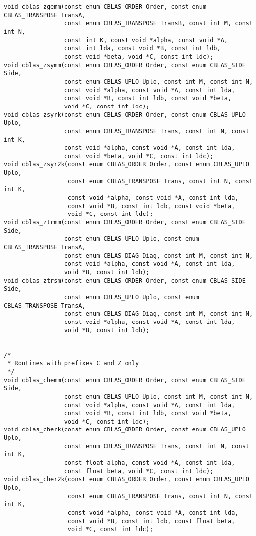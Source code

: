 \documentclass{article}
\begin{document}
\begin{Verbatim}[fontsize=\small,fontfamily=tt,fontshape=rm]
void cblas_zgemm(const enum CBLAS_ORDER Order, const enum CBLAS_TRANSPOSE TransA,
                 const enum CBLAS_TRANSPOSE TransB, const int M, const int N,
                 const int K, const void *alpha, const void *A,
                 const int lda, const void *B, const int ldb,
                 const void *beta, void *C, const int ldc);
void cblas_zsymm(const enum CBLAS_ORDER Order, const enum CBLAS_SIDE Side,
                 const enum CBLAS_UPLO Uplo, const int M, const int N,
                 const void *alpha, const void *A, const int lda,
                 const void *B, const int ldb, const void *beta,
                 void *C, const int ldc);
void cblas_zsyrk(const enum CBLAS_ORDER Order, const enum CBLAS_UPLO Uplo,
                 const enum CBLAS_TRANSPOSE Trans, const int N, const int K,
                 const void *alpha, const void *A, const int lda,
                 const void *beta, void *C, const int ldc);
void cblas_zsyr2k(const enum CBLAS_ORDER Order, const enum CBLAS_UPLO Uplo,
                  const enum CBLAS_TRANSPOSE Trans, const int N, const int K,
                  const void *alpha, const void *A, const int lda,
                  const void *B, const int ldb, const void *beta,
                  void *C, const int ldc);
void cblas_ztrmm(const enum CBLAS_ORDER Order, const enum CBLAS_SIDE Side,
                 const enum CBLAS_UPLO Uplo, const enum CBLAS_TRANSPOSE TransA,
                 const enum CBLAS_DIAG Diag, const int M, const int N,
                 const void *alpha, const void *A, const int lda,
                 void *B, const int ldb);
void cblas_ztrsm(const enum CBLAS_ORDER Order, const enum CBLAS_SIDE Side,
                 const enum CBLAS_UPLO Uplo, const enum CBLAS_TRANSPOSE TransA,
                 const enum CBLAS_DIAG Diag, const int M, const int N,
                 const void *alpha, const void *A, const int lda,
                 void *B, const int ldb);


/* 
 * Routines with prefixes C and Z only
 */
void cblas_chemm(const enum CBLAS_ORDER Order, const enum CBLAS_SIDE Side,
                 const enum CBLAS_UPLO Uplo, const int M, const int N,
                 const void *alpha, const void *A, const int lda,
                 const void *B, const int ldb, const void *beta,
                 void *C, const int ldc);
void cblas_cherk(const enum CBLAS_ORDER Order, const enum CBLAS_UPLO Uplo,
                 const enum CBLAS_TRANSPOSE Trans, const int N, const int K,
                 const float alpha, const void *A, const int lda,
                 const float beta, void *C, const int ldc);
void cblas_cher2k(const enum CBLAS_ORDER Order, const enum CBLAS_UPLO Uplo,
                  const enum CBLAS_TRANSPOSE Trans, const int N, const int K,
                  const void *alpha, const void *A, const int lda,
                  const void *B, const int ldb, const float beta,
                  void *C, const int ldc);


\end{Verbatim}
\end{document}
